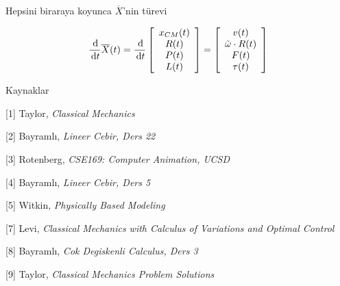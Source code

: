 \documentclass[12pt,fleqn]{article}\usepackage{../../common}
\begin{document}
Hepsini biraraya koyunca $\overline{X}$'nin türevi

$$
\frac{\,\mathrm{d}}{\,\mathrm{d} t} \overline{X}(t) =
\frac{\,\mathrm{d}}{\,\mathrm{d} t}
\left[\begin{array}{c}
x_{CM}(t) \\ R(t) \\ P(t) \\ L(t)
\end{array}\right]
=
\left[\begin{array}{c}
v(t) \\ \tilde \omega \cdot R(t) \\ F(t) \\ \tau(t)
\end{array}\right]
$$

Kaynaklar

[1] Taylor, {\em Classical Mechanics}

[2] Bayramlı, {\em Lineer Cebir, Ders 22}

[3] Rotenberg, {\em CSE169: Computer Animation, UCSD}

[4] Bayramlı, {\em Lineer Cebir, Ders 5}

[5] Witkin, {\em Physically Based Modeling}

[7] Levi, {\em Classical Mechanics with Calculus of Variations and Optimal Control}

[8] Bayramlı, {\em Cok Degiskenli Calculus, Ders 3}
    
[9] Taylor, {\em Classical Mechanics Problem Solutions}
\end{document}
